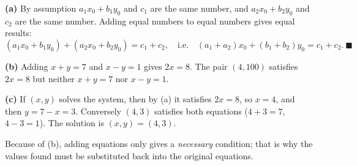 \textbf{(a)} By assumption $a_1x_0+b_1y_0$ and $c_1$ are the same number, and $a_2x_0+b_2y_0$ and $c_2$ are the same number. Adding equal numbers to equal numbers gives equal results:
\[(a_1x_0+b_1y_0)+(a_2x_0+b_2y_0)=c_1+c_2,\quad\text{i.e.}\quad(a_1+a_2)x_0+(b_1+b_2)y_0=c_1+c_2.\ \blacksquare\]

\textbf{(b)} Adding $x+y=7$ and $x-y=1$ gives $2x=8$. The pair $(4,100)$ satisfies $2x=8$ but neither $x+y=7$ nor $x-y=1$.

\textbf{(c)} If $(x,y)$ solves the system, then by (a) it satisfies $2x=8$, so $x=4$, and then $y=7-x=3$. Conversely $(4,3)$ satisfies both equations ($4+3=7$, $4-3=1$). The solution is $\boxed{(x,y)=(4,3)}$.

Because of (b), adding equations only gives a \emph{necessary} condition; that is why the values found must be substituted back into the original equations.
